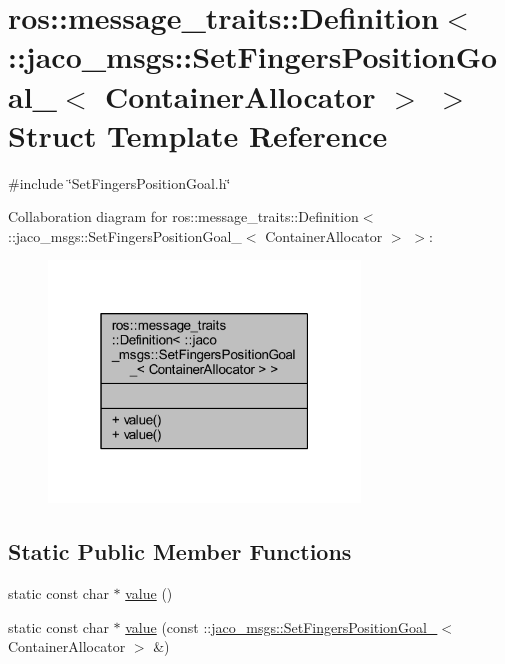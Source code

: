 \hypertarget{structros_1_1message__traits_1_1Definition_3_01_1_1jaco__msgs_1_1SetFingersPositionGoal___3_01ContainerAllocator_01_4_01_4}{}\section{ros\+:\+:message\+\_\+traits\+:\+:Definition$<$ \+:\+:jaco\+\_\+msgs\+:\+:Set\+Fingers\+Position\+Goal\+\_\+$<$ Container\+Allocator $>$ $>$ Struct Template Reference}
\label{structros_1_1message__traits_1_1Definition_3_01_1_1jaco__msgs_1_1SetFingersPositionGoal___3_01ContainerAllocator_01_4_01_4}


{\ttfamily \#include \char`\"{}Set\+Fingers\+Position\+Goal.\+h\char`\"{}}



Collaboration diagram for ros\+:\+:message\+\_\+traits\+:\+:Definition$<$ \+:\+:jaco\+\_\+msgs\+:\+:Set\+Fingers\+Position\+Goal\+\_\+$<$ Container\+Allocator $>$ $>$\+:
\nopagebreak
\begin{figure}[H]
\begin{center}
\leavevmode
\includegraphics[width=235pt]{d2/d88/structros_1_1message__traits_1_1Definition_3_01_1_1jaco__msgs_1_1SetFingersPositionGoal___3_01Co41468856c2cfe51303c06aa2fcf6e05e}
\end{center}
\end{figure}
\subsection*{Static Public Member Functions}
\begin{DoxyCompactItemize}
\item 
static const char $\ast$ \hyperlink{structros_1_1message__traits_1_1Definition_3_01_1_1jaco__msgs_1_1SetFingersPositionGoal___3_01ContainerAllocator_01_4_01_4_a2edc2eba7a5def57a5b8561f733cf298}{value} ()
\item 
static const char $\ast$ \hyperlink{structros_1_1message__traits_1_1Definition_3_01_1_1jaco__msgs_1_1SetFingersPositionGoal___3_01ContainerAllocator_01_4_01_4_a6ccf1c84c757f0dcb56de8b31ef7c9ff}{value} (const \+::\hyperlink{structjaco__msgs_1_1SetFingersPositionGoal__}{jaco\+\_\+msgs\+::\+Set\+Fingers\+Position\+Goal\+\_\+}$<$ Container\+Allocator $>$ \&)
\end{DoxyCompactItemize}


